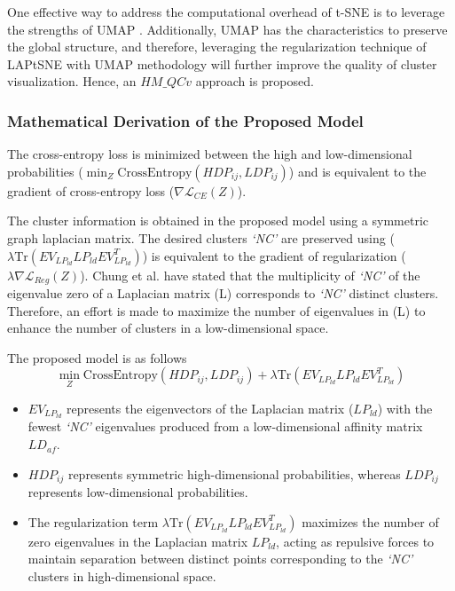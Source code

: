 One effective way to address the computational overhead of t-SNE \cite{tsne} is to leverage the strengths of UMAP \cite{umap_reference}. Additionally, UMAP \cite{umap_reference} has the characteristics to preserve the global structure, and therefore, leveraging the regularization technique of LAPtSNE \cite{sun2023laplacian} with UMAP methodology will further improve the quality of cluster visualization. Hence, an $HM\_QCv$ approach is proposed.



 
\subsubsection{Mathematical Derivation of the Proposed Model}

The cross-entropy loss is minimized between the high and low-dimensional probabilities ($\min_{Z} \text{CrossEntropy}(HDP_{ij}, LDP_{ij})$) and is equivalent to the gradient of cross-entropy loss ($\nabla \mathcal{L}_{CE}(Z)$).  

The cluster information is obtained in the proposed model using a symmetric graph laplacian matrix. The desired clusters \textit{`NC'} are preserved using ($\lambda \text{Tr}(EV_{LP_{ld}} LP_{ld} EV_{LP_{ld}}^T)$) is equivalent to the gradient of regularization ($\lambda \nabla \mathcal{L}_{Reg}(Z)$). Chung et al. \cite{chung1997spectral} have stated that the multiplicity of \textit{`NC'} of the eigenvalue zero of a Laplacian matrix (L) corresponds to \textit{`NC'} distinct clusters. Therefore, an effort is made to maximize the number of eigenvalues in (L) to enhance the number of clusters in a low-dimensional space.


The proposed model is as follows
\begin{equation}
    \min_{Z} \text{CrossEntropy}(HDP_{ij} , LDP_{ij}) + \lambda \text{Tr}(EV_{LP_{ld}} LP_{ld} EV_{LP_{ld}}^T) 
\end{equation}

\begin{itemize}
    \item $EV_{LP_{ld}}$ represents the eigenvectors of the Laplacian matrix ($LP_{ld}$) with the fewest \textit{`NC'} eigenvalues produced from a low-dimensional affinity matrix $LD_{af}$.
    \item $HDP_{ij}$ represents symmetric high-dimensional probabilities, whereas $LDP_{ij}$ represents low-dimensional probabilities.
    \item The regularization term $\lambda \text{Tr}(EV_{LP_{ld}} LP_{ld} EV_{LP_{ld}}^T)$ maximizes the number of zero eigenvalues in the Laplacian matrix $LP_{ld}$, acting as repulsive forces to maintain separation between distinct points corresponding to the \textit{`NC'} clusters in high-dimensional space.
\end{itemize}



